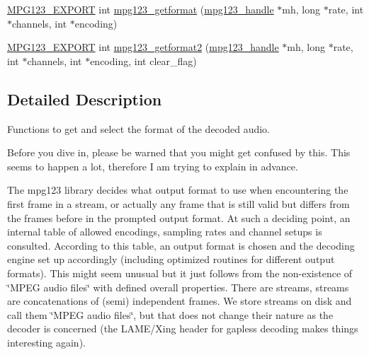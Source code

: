 \begin{DoxyCompactItemize}
\item 
\mbox{\hyperlink{mpg123_8h_a2ba98cfba3f760879df70e755b2a61cc}{M\+P\+G123\+\_\+\+E\+X\+P\+O\+RT}} int \mbox{\hyperlink{group__mpg123__output_gae5e04c7522d620e122009db359cc6dc5}{mpg123\+\_\+getformat}} (\mbox{\hyperlink{group__mpg123__init_ga6728e2839a395f3a07d4514da659faca}{mpg123\+\_\+handle}} $\ast$mh, long $\ast$rate, int $\ast$channels, int $\ast$encoding)
\item 
\mbox{\hyperlink{mpg123_8h_a2ba98cfba3f760879df70e755b2a61cc}{M\+P\+G123\+\_\+\+E\+X\+P\+O\+RT}} int \mbox{\hyperlink{group__mpg123__output_gadf21a63d9ab2fc87e271962f6f583876}{mpg123\+\_\+getformat2}} (\mbox{\hyperlink{group__mpg123__init_ga6728e2839a395f3a07d4514da659faca}{mpg123\+\_\+handle}} $\ast$mh, long $\ast$rate, int $\ast$channels, int $\ast$encoding, int clear\+\_\+flag)
\end{DoxyCompactItemize}


\subsection{Detailed Description}
Functions to get and select the format of the decoded audio.

Before you dive in, please be warned that you might get confused by this. This seems to happen a lot, therefore I am trying to explain in advance.

The mpg123 library decides what output format to use when encountering the first frame in a stream, or actually any frame that is still valid but differs from the frames before in the prompted output format. At such a deciding point, an internal table of allowed encodings, sampling rates and channel setups is consulted. According to this table, an output format is chosen and the decoding engine set up accordingly (including optimized routines for different output formats). This might seem unusual but it just follows from the non-\/existence of \char`\"{}\+M\+P\+E\+G audio files\char`\"{} with defined overall properties. There are streams, streams are concatenations of (semi) independent frames. We store streams on disk and call them \char`\"{}\+M\+P\+E\+G audio files\char`\"{}, but that does not change their nature as the decoder is concerned (the L\+A\+M\+E/\+Xing header for gapless decoding makes things interesting again).

